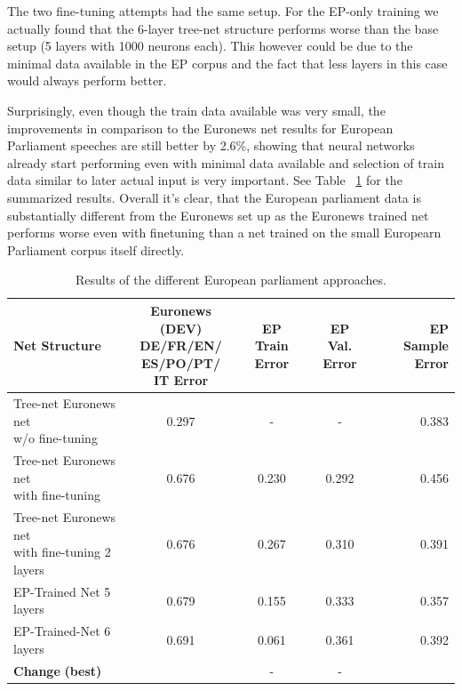 The two fine-tuning attempts had the same setup. For the EP-only training we actually found that the 6-layer tree-net structure performs worse than the base setup (5 layers with 1000 neurons each). This however could be due to the minimal data available in the EP corpus and the fact that less layers in this case would always perform better.

Surprisingly, even though the train data available was very small, the improvements in comparison to the Euronews net results for European Parliament speeches are still better by 2.6\%, showing that neural networks already start performing even with minimal data available and selection of train data similar to later actual input is very important. See Table ~\ref{tab:resultsEP} for the summarized results. Overall it's clear, that the European parliament data is substantially different from the Euronews set up as the Euronews trained net performs worse even with finetuning than a net trained on the small Europearn Parliament corpus itself directly.


\begin{table}
\label{tab:resultsEP}
\caption{Results of the different European parliament approaches.}
\begin{tabular}{| l | c | c | c | r | }
	\hline
	\textbf{Net Structure} & \parbox[t]{2.5cm}{\textbf{Euronews (DEV)} \\ \textbf{DE/FR/EN/} \\ \textbf{ES/PO/PT/} \\ \textbf{IT Error}} & \parbox[t]{2.5cm}{\textbf{EP} \\ \textbf{Train Error}} & \parbox[t]{2.5cm}{\textbf{EP} \\ \textbf{Val. Error}} & \parbox[t]{2.5cm}{\textbf{EP} \\ \textbf{Sample Error}}  \\
	\hline
	\parbox[t]{5cm}{Tree-net Euronews net \\
	 w/o fine-tuning} & 0.297 & - & - & 0.383 \\
	\hline
	\parbox[t]{5cm}{Tree-net Euronews net \\ with fine-tuning } & 0.676 & 0.230 & 0.292 & 0.456 \\
	\hdashline
	\parbox[t]{5cm}{Tree-net Euronews net \\ with fine-tuning 2 layers } & 0.676 & 0.267 & 0.310 & 0.391 \\
	\hdashline
	\parbox[t]{5cm}{EP-Trained Net 5 layers } & 0.679 & 0.155 & 0.333 & 0.357 \\
	\hdashline
	EP-Trained-Net 6 layers & 0.691 & 0.061 & 0.361 & 0.392 \\
	\hline
	\parbox[t]{5cm}{\textbf{Change} \textbf{(best)}} &  & - & - &  \\
	\hline
\end{tabular}
\end{table}

